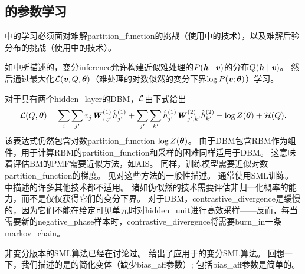 \subsection{的参数学习}
\label{sec:dbm_parameter_learning}

中的学习必须面对难解\gls{partition_function}的挑战（使用中的技术），以及难解后验分布的挑战（使用中的技术）。

如中所描述的，变分\gls{inference}允许构建近似难处理的$P(\boldsymbol{\mathit{h}}  \mid  \boldsymbol{\mathit{v}})$的分布$Q(\boldsymbol{\mathit{h}} \mid \boldsymbol{\mathit{v}})$。
然后通过最大化$\mathcal{L}(\boldsymbol{\mathit{v}}, Q, \boldsymbol{\theta})$（难处理的对数似然的变分下界$\log P(\boldsymbol{\mathit{v}}; \boldsymbol{\theta})$）学习。


对于具有两个\gls{hidden_layer}的\gls{DBM}，$\mathcal{L}$由下式给出
\begin{align}
 \mathcal{L}(Q, \boldsymbol{\theta}) = \sum_i \sum_{j^{\prime}} v_j \boldsymbol{\mathit{W}}_{i,j^{\prime}}^{(1)} 
 \hat h_{j^{\prime}}^{(1)} +  \sum_{j^{\prime}} \sum_{k^{\prime}} \hat h_{j^{\prime}}^{(1)}
 \boldsymbol{\mathit{W}}_{j^{\prime}, k^{\prime}}^{(2)} \hat h_{k^{\prime}}^{(2)} - \log Z(\boldsymbol{\theta}) + \mathcal{H}(Q).
\end{align}
该表达式仍然包含对数\gls{partition_function} $ \log Z(\boldsymbol{\theta}) $。
由于\gls{DBM}包含\gls{RBM}作为组件，用于计算\gls{RBM}的\gls{partition_function}和采样的困难同样适用于\gls{DBM}。
这意味着评估\gls{BM}的\gls{PMF}需要近似方法，如\gls{AIS}。
同样，训练模型需要近似对数\gls{partition_function}的梯度。
见对这些方法的一般性描述。
通常使用\gls{SML}训练。
中描述的许多其他技术都不适用。
诸如伪似然的技术需要评估非归一化概率的能力，而不是仅仅获得它们的变分下界。
对于\gls{DBM}，\gls{contrastive_divergence}是缓慢的，因为它们不能在给定可见单元时对\gls{hidden_unit}进行高效采样——反而，每当需要新的\gls{negative_phase}样本时，\gls{contrastive_divergence}将需要\gls{burn_in}一条\gls{markov_chain}。


非变分版本的\gls{SML}算法已经在讨论过。
给出了应用于的变分\gls{SML}算法。
回想一下，我们描述的是的简化变体（缺少\gls{bias_aff}参数）; 包括\gls{bias_aff}参数是简单的。

